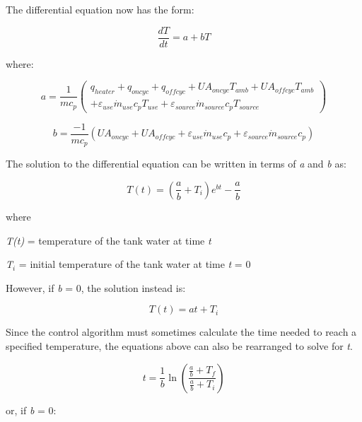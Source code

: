 The differential equation now has the form:

\begin{equation}
\frac{{dT}}{{dt}} = a + bT
\end{equation}

where:

\begin{equation}
a = \frac{1}{{m{c_p}}}\left( \begin{array}{l}{q_{heater}} + {q_{oncyc}} + {q_{offcyc}} + U{A_{oncyc}}{T_{amb}} + U{A_{offcyc}}{T_{amb}}\\ + {\varepsilon_{use}}{{\dot m}_{use}}{c_p}{T_{use}} + {\varepsilon_{source}}{{\dot m}_{source}}{c_p}{T_{source}}\end{array} \right)
\end{equation}

\begin{equation}
b = \frac{{ - 1}}{{m{c_p}}}\left( {U{A_{oncyc}} + U{A_{offcyc}} + {\varepsilon_{use}}{{\dot m}_{use}}{c_p} + {\varepsilon_{source}}{{\dot m}_{source}}{c_p}} \right)
\end{equation}

The solution to the differential equation can be written in terms of \emph{a} and \emph{b} as:

\begin{equation}
T\left( t \right) = \left( {\frac{a}{b} + {T_i}} \right){e^{bt}} - \frac{a}{b}
\end{equation}

where

\emph{T(t)} = temperature of the tank water at time \emph{t}

\emph{T\(_{i}\)} = initial temperature of the tank water at time \emph{t} = 0

However, if \emph{b} = 0, the solution instead is:

\begin{equation}
T\left( t \right) = at + {T_i}
\end{equation}

Since the control algorithm must sometimes calculate the time needed to reach a specified temperature, the equations above can also be rearranged to solve for \emph{t}.

\begin{equation}
t = \frac{1}{b}\ln \left( {\frac{{{\frac{a}{b}} + {T_f}}}{{{\frac{a}{b}} + {T_i}}}} \right)
\end{equation}

or, if \emph{b} = 0:

